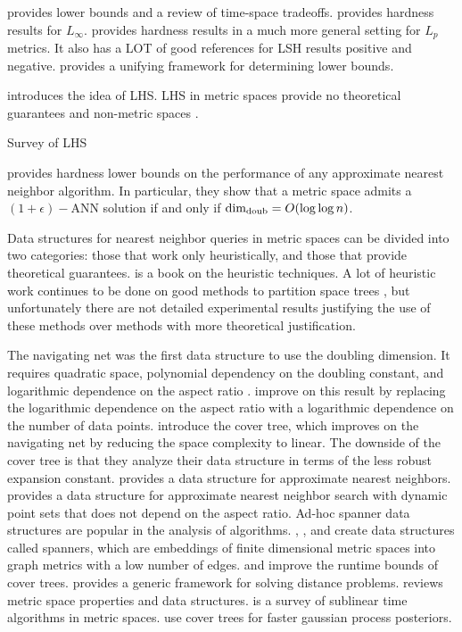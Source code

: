 \documentclass[../main.tex]{subfiles}
\newcommand{\doubdim}{\text{dim}_\textnormal{doub}}
\begin{document}
\cite{borodin1999lower,barkol2000tighter,panigrahy2008geometric} provides lower bounds and a review of time-space tradeoffs.
\cite{andoni2008hardness} provides hardness results for $L_\infty$.
\cite{andoni2016lower} provides hardness results in a much more general setting for $L_p$ metrics.
It also has a LOT of good references for LSH results positive and negative.
\cite{p2011unifying} provides a unifying framework for determining lower bounds.

\cite{gionis1999similarity} introduces the idea of LHS.
LHS in metric spaces \cite{tellez2010locality,novak2010locality} provide no theoretical guarantees and non-metric spaces \cite{mu2010non}.

Survey of LHS \cite{wang2014hashing} \cite{wang2016learning}

\cite{krauthgamer2005black} provides hardness lower bounds on the performance of any approximate nearest neighbor algorithm. 
In particular, they show that a metric space admits a $(1+\epsilon)-$ANN solution if and only if $\doubdim = O(\log \log n)$.

Data structures for nearest neighbor queries in metric spaces can be divided into two categories:
those that work only heuristically,
and those that provide theoretical guarantees.
\cite{zezula2006similarity} is a book on the heuristic techniques. 
A lot of heuristic work continues to be done on good methods to partition space trees \cite{mao2016pivot},
but unfortunately there are not detailed experimental results justifying the use of these methods over methods with more theoretical justification.

The navigating net was the first data structure to use the doubling dimension.
It requires quadratic space, polynomial dependency on the doubling constant, and logarithmic dependence on the aspect ratio \citep{krauthgamer2004navigating}.
\cite{krauthgamer2005black} improve on this result by replacing the logarithmic dependence on the aspect ratio with a logarithmic dependence on the number of data points.
\citet{beygelzimer2006cover} introduce the cover tree,
which improves on the navigating net by reducing the space complexity to linear.
The downside of the cover tree is that they analyze their data structure in terms of the less robust expansion constant.
\cite{har2006fast} provides a data structure for approximate nearest neighbors.
\cite{cole2006searching} provides a data structure for approximate nearest neighbor search with dynamic point sets that does not depend on the aspect ratio.
Ad-hoc spanner data structures are popular in the analysis of algorithms.
\cite{chan2005hierarchical}, \cite{gottlieb2008optimal}, \cite{gottlieb2014light} and \cite{gottlieb2015light} create data structures called spanners,
which are embeddings of finite dimensional metric spaces into graph metrics with a low number of edges.
\cite{ram2009linear} and \cite{curtin2015plug} improve the runtime bounds of cover trees.
\cite{curtin2013tree} provides a generic framework for solving distance problems.
\cite{clarkson2006nearest} reviews metric space properties and data structures.
\cite{czumaj2010sublinear} is a survey of sublinear time algorithms in metric spaces.
\cite{moore2014fast} use cover trees for faster gaussian process posteriors.
\end{document}
